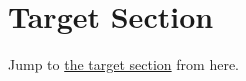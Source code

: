 \documentclass{article}
\begin{document}
\section{Target Section}\label{sec:target}
Jump to \hyperref[sec:target]{the target section} from here.
\end{document}
